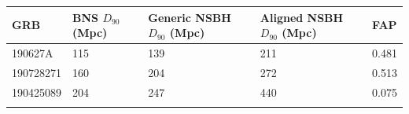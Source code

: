 \documentclass[binding=0.6cm, LaM]{sapthesis}
\begin{document}
\begin{tabular}{ |p{1.7cm}||p{2cm}|p{2.5cm}|p{2.5cm}||p{1cm}| }
 \hline
 GRB& BNS $D_{90}$ (Mpc) & Generic NSBH $D_{90}$ (Mpc)&Aligned NSBH $D_{90}$ (Mpc)& FAP\\
 \hline
190627A   & 115    &139&   211 & 0.481 \\
190728271 &   160  & 204   &272 & 0.513\\
190425089 &204 & 247&  440 & 0.075\\
 \hline
\label{table:1}
\end{tabular}

\backmatter
\cleardoublepage




\end{document}
